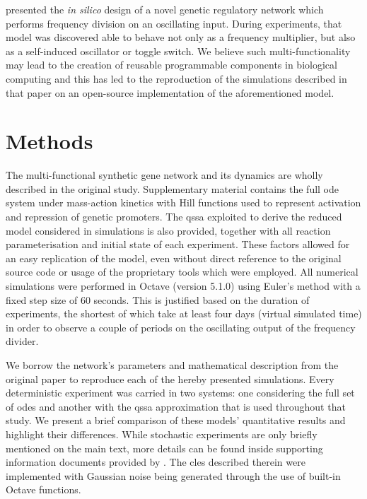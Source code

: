   \citet{originals} presented the \textit{in silico} design of a novel genetic regulatory network which performs frequency division on an oscillating input.
  During experiments, that model was discovered able to behave not only as a frequency multiplier, but also as a self-induced oscillator or toggle switch.
  We believe such multi-functionality may lead to the creation of reusable programmable components in biological computing and this has led to the reproduction of the simulations described in that paper on an open-source implementation of the aforementioned model.


\section{Methods}

  The multi-functional synthetic gene network and its dynamics are wholly described in the original study.
  Supplementary material contains the full \ac{ode} system under mass-action kinetics with Hill functions used to represent activation and repression of genetic promoters.
  The \ac{qssa} exploited to derive the reduced model considered in simulations is also provided, together with all reaction parameterisation and initial state of each experiment.
  These factors allowed for an easy replication of the model, even without direct reference to the original source code or usage of the proprietary tools which were employed.
  All numerical simulations were performed in Octave (version 5.1.0) using Euler's method with a fixed step size of 60 seconds.
  This is justified based on the duration of experiments, the shortest of which take at least four days (virtual simulated time) in order to observe a couple of periods on the oscillating output of the frequency divider.

  We borrow the network's parameters and mathematical description from the original paper to reproduce each of the hereby presented simulations.
  Every deterministic experiment was carried in two systems: one considering the full set of \ac{ode}s and another with the \ac{qssa} approximation that is used throughout that study.
  We present a brief comparison of these models' quantitative results and highlight their differences.
  While stochastic experiments are only briefly mentioned on the main text, more details can be found inside supporting information documents provided by \citet{originals}.
  The \ac{cles} described therein were implemented with Gaussian noise being generated through the use of built-in Octave functions.

